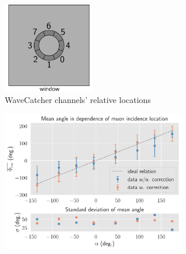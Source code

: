 \documentclass[aspectratio=169]{beamer}
\begin{document}
\begin{frame}
\begin{columns}
		\end{columns}
								
	\end{frame}
	
	
	\begin{frame}
		\centering
		\includegraphics[width=0.3\textwidth]{pictures/relative-locations_realChannels.pdf} \\
		WaveCatcher channels' relative locations
	\end{frame}
	
	\begin{frame}
		\centering
		\includegraphics[width=0.6\textwidth]{new_alex/phi_ew_alpha_corruncorr.pdf}
	\end{frame}
\end{document}
